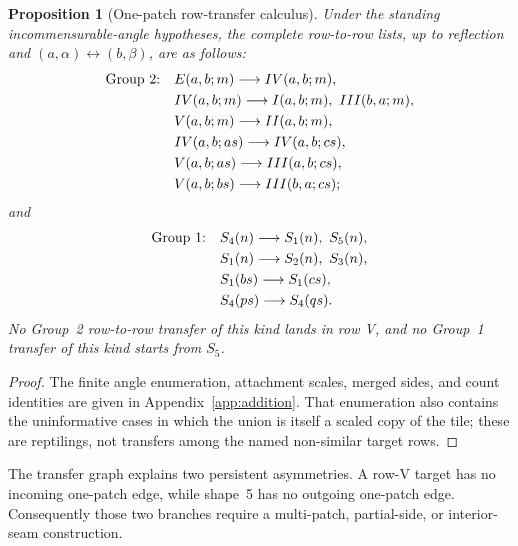 \documentclass[11pt]{amsart}
\newtheorem{proposition}[theorem]{Proposition}
\theoremstyle{definition}
\theoremstyle{remark}
\begin{document}
\begin{proposition}[One-patch row-transfer calculus]\label{prop:onepatch}
Under the standing incommensurable-angle hypotheses, the complete
row-to-row lists, up to reflection and
$(a,\alpha)\leftrightarrow(b,\beta)$, are as follows:
\begin{align*}
\text{\rm Group 2:}\quad&
 E(a,b;m)\longrightarrow IV(a,b;m),\\
&IV(a,b;m)\longrightarrow I(a,b;m),\ III(b,a;m),\\
&V(a,b;m)\longrightarrow II(a,b;m),\\
&IV(a,b;as)\longrightarrow IV(a,b;cs),\\
&V(a,b;as)\longrightarrow III(a,b;cs),\\
&V(a,b;bs)\longrightarrow III(b,a;cs);
\end{align*}
and
\begin{align*}
\text{\rm Group 1:}\quad&
 S_4(n)\longrightarrow S_1(n),\ S_5(n),\\
&S_1(n)\longrightarrow S_2(n),\ S_3(n),\\
&S_1(bs)\longrightarrow S_1(cs),\\
&S_4(ps)\longrightarrow S_4(qs).
\end{align*}
No Group~2 row-to-row transfer of this kind lands in row V, and no Group~1
transfer of this kind starts from $S_5$.
\end{proposition}

\begin{proof}
The finite angle enumeration, attachment scales, merged sides, and count
identities are given in Appendix~\ref{app:addition}.  That enumeration also
contains the uninformative cases in which the union is itself a scaled copy
of the tile; these are reptilings, not transfers among the named non-similar
target rows.
\end{proof}

The transfer graph explains two persistent asymmetries.  A row-V target has
no incoming one-patch edge, while shape~5 has no outgoing one-patch edge.
Consequently those two branches require a multi-patch, partial-side, or
interior-seam construction.
\end{document}
